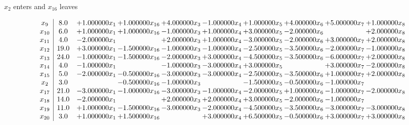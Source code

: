 \documentclass[10pt]{article}
\begin{document}
 $ x_{2} $ enters and $ x_{16} $ leaves 

 \[\begin{array}{c| c c@{\hskip 2pt} c@{\hskip 2pt} c@{\hskip 2pt} c@{\hskip 2pt} c@{\hskip 2pt} c@{\hskip 2pt} c@{\hskip 2pt} c@{\hskip 2pt} }
 x_{9}   &  8.0 & + 1.000000 x_{1} & + 1.000000 x_{16} & + 4.000000 x_{3} & -1.000000 x_{4} & + 1.000000 x_{5} & + 4.000000 x_{6} & + 5.000000 x_{7} & + 1.000000 x_{8}\\
 x_{10}   &  6.0 & + 1.000000 x_{1} & + 1.000000 x_{16} & -1.000000 x_{3} & + 1.000000 x_{4} & + 3.000000 x_{5} & -2.000000 x_{6} &   & + 2.000000 x_{8}\\
 x_{11}   &  4.0 & -2.000000 x_{1} &   & + 2.000000 x_{3} & + 1.000000 x_{4} & -3.000000 x_{5} & -2.000000 x_{6} & + 3.000000 x_{7} & + 2.000000 x_{8}\\
 x_{12}   &  19.0 & + 3.000000 x_{1} & -1.500000 x_{16} & -1.000000 x_{3} & -1.000000 x_{4} & -2.500000 x_{5} & -3.500000 x_{6} & -2.000000 x_{7} & -1.000000 x_{8}\\
 x_{13}   &  24.0 & -1.000000 x_{1} & -1.500000 x_{16} & -2.000000 x_{3} & + 3.000000 x_{4} & -4.500000 x_{5} & -3.500000 x_{6} & -6.000000 x_{7} & + 2.000000 x_{8}\\
 x_{14}   &  4.0 & -1.000000 x_{1} &   & -1.000000 x_{3} & -3.000000 x_{4} & + 3.000000 x_{5} &   & + 3.000000 x_{7} & -2.000000 x_{8}\\
 x_{15}   &  5.0 & -2.000000 x_{1} & -0.500000 x_{16} & -3.000000 x_{3} & -3.000000 x_{4} & -2.500000 x_{5} & -3.500000 x_{6} & + 1.000000 x_{7} & + 2.000000 x_{8}\\
 x_{2}   &  3.0  &   & -0.500000 x_{16} & -1.000000 x_{3} &   & -1.500000 x_{5} & -0.500000 x_{6} & -1.000000 x_{7} &   \\
 x_{17}   &  21.0 & -3.000000 x_{1} & -1.000000 x_{16} & -3.000000 x_{3} & -1.000000 x_{4} & -2.000000 x_{5} & + 1.000000 x_{6} & -1.000000 x_{7} & -2.000000 x_{8}\\
 x_{18}   &  14.0 & -2.000000 x_{1} &   & + 2.000000 x_{3} & + 2.000000 x_{4} & + 3.000000 x_{5} & -2.000000 x_{6} & -1.000000 x_{7} &   \\
 x_{19}   &  11.0 & + 1.000000 x_{1} & -1.500000 x_{16} & -3.000000 x_{3} & -2.000000 x_{4} & -4.500000 x_{5} & -3.500000 x_{6} & -3.000000 x_{7} & -3.000000 x_{8}\\
 x_{20}   &  3.0 & + 1.000000 x_{1} & + 1.500000 x_{16} &   & + 3.000000 x_{4} & + 6.500000 x_{5} & -0.500000 x_{6} & + 3.000000 x_{7} & + 3.000000 x_{8}\\

\end{array}\]
\end{document}
